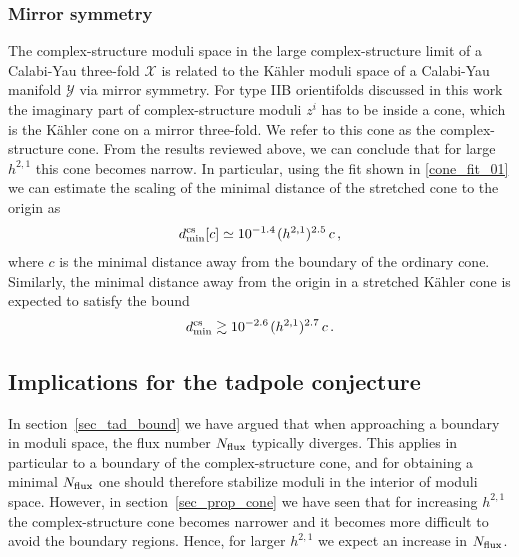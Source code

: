 \documentclass[12pt,a4paper]{article}
\newcommand{\eq}[1]{\begin{equation}
                     \begin{split} #1 \end{split}
                     \end{equation}}
\newcommand{\op}{\hspace{1pt}}
\numberwithin{equation}{section}
\begin{document}
\subsubsection*{Mirror symmetry}


The complex-structure moduli space in the large complex-structure limit of a Calabi-Yau three-fold $\mathcal X$ 
is related to the K\"ahler moduli space of a Calabi-Yau manifold 
$\mathcal Y$ via mirror symmetry. 
For type IIB orientifolds discussed in this work the imaginary part of 
complex-structure moduli $z^i$ has to be inside a cone, which is the
K\"ahler cone on a mirror three-fold. 
We refer to this cone as the complex-structure cone.
From the results reviewed above, we 
can conclude that for large $h^{2,1}$ this cone becomes narrow. 
In particular, using the fit shown in \eqref{cone_fit_01} we can estimate the 
scaling of the minimal distance of the stretched cone to the origin as
\eq{
\label{tad_822}
 d^{\rm cs}_{\rm min}[c] \simeq 10^{-1.4} \op (h^{2,1})^{2.5} \, c\,,
}
where $c$ is the minimal distance away from the boundary of the ordinary cone. 
Similarly, the minimal distance away from the origin in a stretched K\"ahler cone 
is expected to satisfy the bound
\eq{
\label{tad_823}
  d^{\rm cs}_{\rm min}\gtrsim 10^{-2.6} \op (h^{2,1})^{2.7}\, c\,.
}




\subsection{Implications for the tadpole conjecture}
\label{sec_scaling}


In section~\ref{sec_tad_bound} we have argued that  when approaching a boundary in 
moduli space, the flux number $N_{\rm flux}$ typically diverges.
This applies in particular to a boundary of the complex-structure cone, and  for obtaining a minimal 
$N_{\rm flux}$ one should therefore stabilize moduli in the interior of moduli space. 
However, in section~\ref{sec_prop_cone} we have seen that for increasing 
$h^{2,1}$ the complex-structure cone becomes narrower and 
it  becomes more difficult to avoid the boundary regions.
Hence, for larger $h^{2,1}$ we expect an increase in $N_{\rm flux}$.


\end{document}
